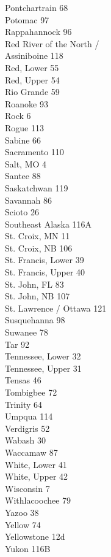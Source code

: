 \documentclass[11pt]{article}
\begin{document}
\begin{multicols}{3}
Pontchartrain 68\\
Potomac 97\\
Rappahannock 96\\
Red River of the North / \\ \quad Assiniboine 118\\
Red, Lower 55\\
Red, Upper 54\\
Rio Grande 59\\
Roanoke 93\\
Rock 6\\
Rogue 113\\
Sabine 66\\
Sacramento 110\\
Salt, MO 4\\
Santee 88\\
Saskatchwan 119\\
Savannah 86\\
Scioto 26\\
Southeast Alaska 116A\\
St. Croix, MN 11\\
St. Croix, NB 106\\
St. Francis, Lower 39\\
St. Francis, Upper 40\\
St. John, FL 83\\
St. John, NB 107\\
St. Lawrence / Ottawa 121\\
Susquehanna 98\\
Suwanee 78\\
Tar 92\\
Tennessee, Lower 32\\
Tennessee, Upper 31\\
Tensas 46\\
Tombigbee 72\\
Trinity 64\\
Umpqua 114\\
Verdigris 52\\
Wabash 30\\
Waccamaw 87\\
White, Lower 41\\
White, Upper 42\\
Wisconsin 7\\
Withlacoochee 79\\
Yazoo 38\\
Yellow 74\\
Yellowstone 12d\\
Yukon 116B
\end{multicols}
\end{document}
